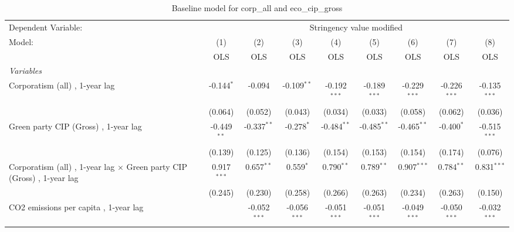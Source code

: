 
\begin{table}[htbp]
   \caption{Baseline model for corp\_all and eco\_cip\_gross}
   \centering
   \begin{tabular}{lcccccccc}
      \toprule
      Dependent Variable: & \multicolumn{8}{c}{Stringency value modified}\\
      Model:                                                                        & (1)           & (2)            & (3)            & (4)            & (5)            & (6)            & (7)            & (8)\\  
                                                                                    &  OLS          & OLS            & OLS            & OLS            & OLS            & OLS            & OLS            & OLS\\  
      \midrule
      \emph{Variables}\\
      Corporatism (all) , 1-year lag                                                & -0.144$^{*}$  & -0.094         & -0.109$^{**}$  & -0.192$^{***}$ & -0.189$^{***}$ & -0.229$^{***}$ & -0.226$^{***}$ & -0.135$^{***}$\\   
                                                                                    & (0.064)       & (0.052)        & (0.043)        & (0.034)        & (0.033)        & (0.058)        & (0.062)        & (0.036)\\   
      Green party CIP (Gross) , 1-year lag                                          & -0.449$^{**}$ & -0.337$^{**}$  & -0.278$^{*}$   & -0.484$^{**}$  & -0.485$^{**}$  & -0.465$^{**}$  & -0.400$^{*}$   & -0.515$^{***}$\\   
                                                                                    & (0.139)       & (0.125)        & (0.136)        & (0.154)        & (0.153)        & (0.154)        & (0.174)        & (0.076)\\   
      Corporatism (all) , 1-year lag $\times$ Green party CIP (Gross) , 1-year lag  & 0.917$^{***}$ & 0.657$^{**}$   & 0.559$^{*}$    & 0.790$^{**}$   & 0.789$^{**}$   & 0.907$^{***}$  & 0.784$^{**}$   & 0.831$^{***}$\\   
                                                                                    & (0.245)       & (0.230)        & (0.258)        & (0.266)        & (0.263)        & (0.234)        & (0.263)        & (0.150)\\   
      CO2 emissions per capita , 1-year lag                                         &               & -0.052$^{***}$ & -0.056$^{***}$ & -0.051$^{***}$ & -0.051$^{***}$ & -0.049$^{***}$ & -0.050$^{***}$ & -0.032$^{***}$\\   

\end{tabular}
\end{table}

